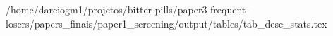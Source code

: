 /home/darciogm1/projetos/bitter-pills/paper3-frequent-losers/papers_finais/paper1_screening/output/tables/tab_desc_stats.tex